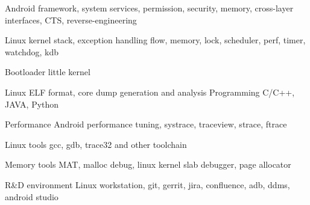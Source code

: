 

\begin{cvskills}

  \cvskill
    {Android}
    {framework, system services, permission, security, memory, cross-layer interfaces, CTS, reverse-engineering}

  \cvskill
    {Linux kernel}
    {stack, exception handling flow, memory, lock, scheduler, perf, timer, watchdog, kdb}

  \cvskill
    {Bootloader}
    {little kernel}

  \cvskill
    {Linux}
    {ELF format, core dump generation and analysis}
  \cvskill
    {Programming} %
    {C/C++, JAVA, Python} %

  \cvskill
    {Performance} %
    {Android performance tuning, systrace, traceview, strace, ftrace} %

  \cvskill
    {Linux tools} %
    {gcc, gdb, trace32 and other toolchain} %

  \cvskill
    {Memory tools}
    {MAT, malloc debug, linux kernel slab debugger, page allocator}

  \cvskill
    {R\&D environment}
    {Linux workstation, git, gerrit, jira, confluence, adb, ddms, android studio}

\end{cvskills}
